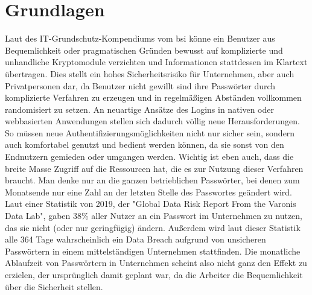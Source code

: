 \chapter{Grundlagen}
Laut des IT-Grundschutz-Kompendiums vom \ac{bsi} könne ein Benutzer aus Bequemlichkeit oder pragmatischen Gründen bewusst auf komplizierte und unhandliche Kryptomodule verzichten und Informationen stattdessen im Klartext übertragen. \cite{A1} Dies stellt ein hohes Sicherheitsrisiko für Unternehmen, aber auch Privatpersonen dar, da Benutzer nicht gewillt sind ihre Passwörter durch komplizierte Verfahren zu erzeugen und in regelmäßigen Abständen vollkommen randomisiert zu setzen. An neuartige Ansätze des Logins in nativen oder webbasierten Anwendungen stellen sich dadurch völlig neue Herausforderungen. So müssen neue Authentifizierungsmöglichkeiten nicht nur sicher sein, sondern auch komfortabel genutzt und bedient werden können, da sie sonst von den Endnutzern gemieden oder umgangen werden. Wichtig ist eben auch, dass die breite Masse Zugriff auf die Ressourcen hat, die es zur Nutzung dieser Verfahren braucht. Man denke nur an die ganzen betrieblichen Passwörter, bei denen zum Monatsende nur eine Zahl an der letzten Stelle des Passwortes geändert wird. Laut einer Statistik von 2019, der "Global Data Risk Report From the Varonis Data Lab", gaben 38\% aller Nutzer an ein Passwort im Unternehmen zu nutzen, das sie nicht (oder nur geringfügig) ändern. Außerdem wird laut dieser Statistik alle 364 Tage wahrscheinlich ein Data Breach aufgrund von unsicheren Passwörtern in einem mittelständigen Unternehmen stattfinden. Die monatliche Ablaufzeit von Passwörtern in Unternehmen scheint also nicht ganz den Effekt zu erzielen, der ursprünglich damit geplant war, da die Arbeiter die Bequemlichkeit über die Sicherheit stellen.

